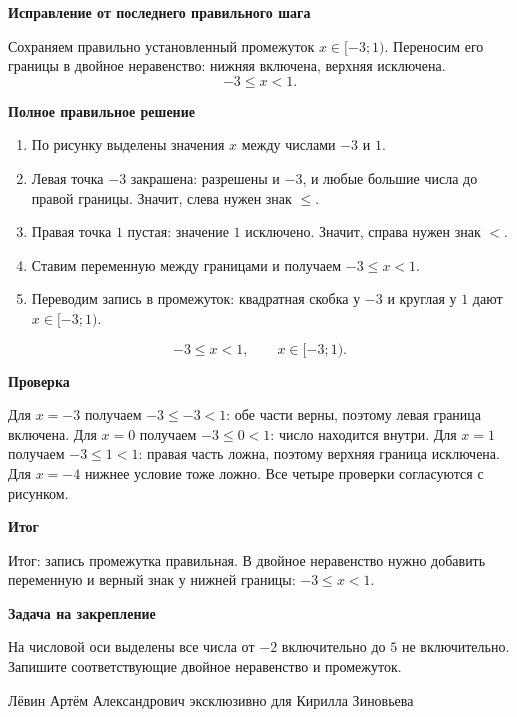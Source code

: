 \documentclass[12pt,a4paper]{article}
\newcommand{\reviewlabel}[1]{\medskip\noindent\textbf{#1}\par}
\begin{document}
\reviewlabel{Исправление от последнего правильного шага}
Сохраняем правильно установленный промежуток $x\in[-3;1)$. Переносим его границы в двойное неравенство: нижняя включена, верхняя исключена.
\[
\boxed{-3\le x<1.}
\]

\reviewlabel{Полное правильное решение}
\begin{enumerate}
\item По рисунку выделены значения $x$ между числами $-3$ и $1$.
\item Левая точка $-3$ закрашена: разрешены и $-3$, и любые большие числа до правой границы. Значит, слева нужен знак $\le$.
\item Правая точка $1$ пустая: значение $1$ исключено. Значит, справа нужен знак $<$.
\item Ставим переменную между границами и получаем $-3\le x<1$.
\item Переводим запись в промежуток: квадратная скобка у $-3$ и круглая у $1$ дают $x\in[-3;1)$.
\end{enumerate}
\[
\boxed{-3\le x<1,\qquad x\in[-3;1).}
\]

\reviewlabel{Проверка}
Для $x=-3$ получаем $-3\le-3<1$: обе части верны, поэтому левая граница включена. Для $x=0$ получаем $-3\le0<1$: число находится внутри. Для $x=1$ получаем $-3\le1<1$: правая часть ложна, поэтому верхняя граница исключена. Для $x=-4$ нижнее условие тоже ложно. Все четыре проверки согласуются с рисунком.

\reviewlabel{Итог}
\textcolor{teal!60!black}{Итог:} запись промежутка правильная. В двойное неравенство нужно добавить переменную и верный знак у нижней границы: $-3\le x<1$.

\reviewlabel{Задача на закрепление}
На числовой оси выделены все числа от $-2$ включительно до $5$ не включительно. Запишите соответствующие двойное неравенство и промежуток.

\vfill
\begin{center}
\footnotesize Лёвин Артём Александрович эксклюзивно для Кирилла Зиновьева
\end{center}
\end{document}
